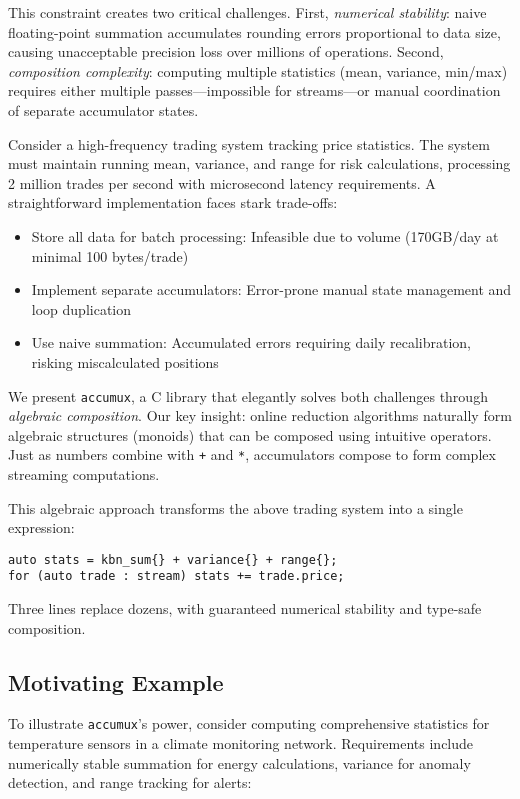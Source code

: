 \documentclass[sigconf]{acmart}
\newcommand{\accumux}{\texttt{accumux}\xspace}
\newcommand{\cpp}{C\nolinebreak\hspace{-.05em}\raisebox{.4ex}{\tiny\bf +}\nolinebreak\hspace{-.10em}\raisebox{.4ex}{\tiny\bf +}\xspace}
\begin{document}
This constraint creates two critical challenges. First, \emph{numerical stability}: naive floating-point summation accumulates rounding errors proportional to data size, causing unacceptable precision loss over millions of operations. Second, \emph{composition complexity}: computing multiple statistics (mean, variance, min/max) requires either multiple passes---impossible for streams---or manual coordination of separate accumulator states.

Consider a high-frequency trading system tracking price statistics. The system must maintain running mean, variance, and range for risk calculations, processing 2 million trades per second with microsecond latency requirements. A straightforward implementation faces stark trade-offs:
\begin{itemize}
\item Store all data for batch processing: Infeasible due to volume (170GB/day at minimal 100 bytes/trade)
\item Implement separate accumulators: Error-prone manual state management and loop duplication
\item Use naive summation: Accumulated errors requiring daily recalibration, risking miscalculated positions
\end{itemize}

We present \accumux, a \cpp library that elegantly solves both challenges through \emph{algebraic composition}. Our key insight: online reduction algorithms naturally form algebraic structures (monoids) that can be composed using intuitive operators. Just as numbers combine with \texttt{+} and \texttt{*}, accumulators compose to form complex streaming computations.

This algebraic approach transforms the above trading system into a single expression:
\begin{lstlisting}[basicstyle=\footnotesize\ttfamily, numbers=none, frame=none]
auto stats = kbn_sum{} + variance{} + range{};
for (auto trade : stream) stats += trade.price;
\end{lstlisting}

Three lines replace dozens, with guaranteed numerical stability and type-safe composition.

\subsection{Motivating Example}

To illustrate \accumux's power, consider computing comprehensive statistics for temperature sensors in a climate monitoring network. Requirements include numerically stable summation for energy calculations, variance for anomaly detection, and range tracking for alerts:
\end{document}
